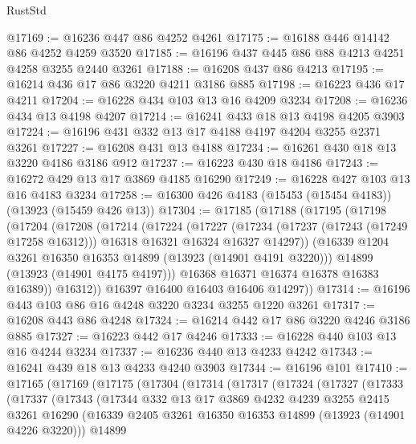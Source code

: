 \begin{lexlean}{RustStd}
\begin{coremodule}
{\begin{coremodule}
{{{{{{{{{{{{{{{{{{{{{{{{{{{{{{{{{{{{{@17169 := @16236 @447 @86 @4252 @4261
@17175 := @16188 @446 @14142 @86 @4252 @4259 @3520
@17185 := @16196 @437 @445 @86 @88 @4213 @4251 @4258 @3255 @2440 @3261
@17188 := @16208 @437 @86 @4213
@17195 := @16214 @436 @17 @86 @3220 @4211 @3186 @885
@17198 := @16223 @436 @17 @4211
@17204 := @16228 @434 @103 @13 @16 @4209 @3234
@17208 := @16236 @434 @13 @4198 @4207
@17214 := @16241 @433 @18 @13 @4198 @4205 @3903
@17224 := @16196 @431 @332 @13 @17 @4188 @4197 @4204 @3255 @2371 @3261
@17227 := @16208 @431 @13 @4188
@17234 := @16261 @430 @18 @13 @3220 @4186 @3186 @912
@17237 := @16223 @430 @18 @4186
@17243 := @16272 @429 @13 @17 @3869 @4185 @16290
@17249 := @16228 @427 @103 @13 @16 @4183 @3234
@17258 := @16300 @426 @4183 (@15453 (@15454 @4183)) (@13923 (@15459 @426 @13))
@17304 := @17185
    (@17188
      (@17195
        (@17198
          (@17204
            (@17208
              (@17214
                (@17224
                  (@17227
                    (@17234
                      (@17237 (@17243 (@17249 @17258 @16312)))
                      @16318
                      @16321
                      @16324
                      @16327
                      @14297))
                  (@16339 @1204 @3261 @16350 @16353 @14899 (@13923 (@14901 @4191 @3220)))
                  @14899
                  (@13923 (@14901 @4175 @4197)))
                @16368
                @16371
                @16374
                @16378
                @16383
                @16389))
            @16312))
        @16397
        @16400
        @16403
        @16406
        @14297))
@17314 := @16196 @443 @103 @86 @16 @4248 @3220 @3234 @3255 @1220 @3261
@17317 := @16208 @443 @86 @4248
@17324 := @16214 @442 @17 @86 @3220 @4246 @3186 @885
@17327 := @16223 @442 @17 @4246
@17333 := @16228 @440 @103 @13 @16 @4244 @3234
@17337 := @16236 @440 @13 @4233 @4242
@17343 := @16241 @439 @18 @13 @4233 @4240 @3903
@17344 := @16196 @101
@17410 := @17165
    (@17169
      (@17175
        (@17304
          (@17314
            (@17317
              (@17324
                (@17327
                  (@17333
                    (@17337
                      (@17343
                        (@17344
                          @332
                          @13
                          @17
                          @3869
                          @4232
                          @4239
                          @3255
                          @2415
                          @3261
                          @16290
                          (@16339 @2405 @3261 @16350 @16353 @14899 (@13923 (@14901 @4226 @3220)))
                          @14899
}}}}}}}}}}}}}}}}}}}}}}}}}}}}}}}}}}}}}
\end{coremodule}}
\end{coremodule}
\end{lexlean}
